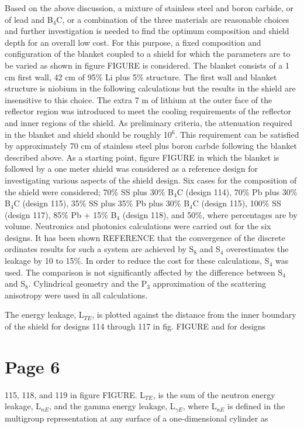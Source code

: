 \documentclass[11pt]{report} %
\begin{document}
Based on the above discussion, a mixture of stainless steel and boron carbide, or of lead and B$_4$C, or a combination of the three materials are reasonable choices and further investigation is needed to find the optimum composition and shield depth for an overall low cost. For this purpose, a fixed composition and configuration of the blanket coupled to a shield for which the parameters are to be varied as shown in figure FIGURE is considered. The blanket consists of a 1 cm first wall, 42 cm of 95\% Li plus 5\% structure. The first wall and blanket structure is niobium in the following calculations but the results in the shield are insensitive to this choice. The extra 7 m of lithium at the outer face of the reflector region was introduced to meet the cooling requirements of the reflector and inner regions of the shield. As preliminary criteria, the attenuation required in the blanket and shield should be roughly 10$^6$. This requirement can be satisfied by approximately 70 cm of stainless steel plus boron carbde following the blanket described above. As a starting point, figure FIGURE in which the blanket is followed by a one meter shield was considered as a reference design for investigating various aspects of the shield design. Six cases for the composition of the shield were considered; 70\% SS plus 30\% B$_4$C (design 114), 70\% Pb plus 30\% B$_4$C (design 115), 35\% SS plus 35\% Pb plus 30\% B$_4$C (design 115), 100\% SS (design 117), 85\% Pb + 15\% B$_4$ (design 118), and 50\%, where percentages are by volume. Neutronics and photonics calculations were carried out for the six designs. It has been shown REFERENCE that the convergence of the discrete ordinates results for such a system are achieved by S$_8$ and S$_4$ overestimates the leakage by 10 to 15\%. In order to reduce the cost for these calculations, S$_4$ was used. The comparison is not significantly affected by the difference between S$_4$ and S$_8$. Cylindrical geometry and the P$_3$ approximation of the scattering anisotropy were used in all calculations.

The energy leakage, L$_{TE}$, is plotted against the distance from the inner boundary of the shield for designs 114 through 117 in fig. FIGURE and for designs
\section{Page 6}
115, 118, and 119 in figure FIGURE. L$_{TE}$, is the sum of the neutron energy leakage, L$_{nE}$, and the gamma energy leakage, L$_{\gamma E}$, where L$_{nE}$ is defined in the multigroup representation at any surface of a one-dimensional cylinder as
\end{document}
